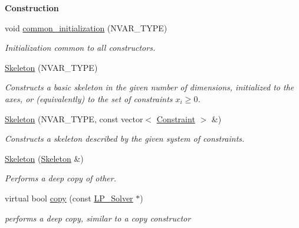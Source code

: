\begin{Indent}\textbf{ Construction}\par
\begin{DoxyCompactItemize}
\item 
\mbox{\label{group___c_l_s_solvers_aa63d9454338c84be898e1a604eba3527}} 
void \hyperlink{group___c_l_s_solvers_aa63d9454338c84be898e1a604eba3527}{common\+\_\+initialization} (N\+V\+A\+R\+\_\+\+T\+Y\+PE)
\begin{DoxyCompactList}\small\item\em Initialization common to all constructors. \end{DoxyCompactList}\item 
\hyperlink{group___c_l_s_solvers_ad9f2f64c49dbf96ebd30852e670e7642}{Skeleton} (N\+V\+A\+R\+\_\+\+T\+Y\+PE)
\begin{DoxyCompactList}\small\item\em Constructs a basic skeleton in the given number of dimensions, initialized to the axes, or (equivalently) to the set of constraints $ x_i \geq 0 $. \end{DoxyCompactList}\item 
\hyperlink{group___c_l_s_solvers_ad61d70c2397e93141de3ad3c987b1828}{Skeleton} (N\+V\+A\+R\+\_\+\+T\+Y\+PE, const vector$<$ \hyperlink{group___c_l_s_solvers_class_l_p___solvers_1_1_constraint}{Constraint} $>$ \&)
\begin{DoxyCompactList}\small\item\em Constructs a skeleton described by the given system of constraints. \end{DoxyCompactList}\item 
\mbox{\label{group___c_l_s_solvers_ae1d6983329c8624014fa5c9d66f75ac3}} 
\hyperlink{group___c_l_s_solvers_ae1d6983329c8624014fa5c9d66f75ac3}{Skeleton} (\hyperlink{group___c_l_s_solvers_class_l_p___solvers_1_1_skeleton}{Skeleton} \&)
\begin{DoxyCompactList}\small\item\em Performs a deep copy of {\ttfamily other}. \end{DoxyCompactList}\item 
virtual bool \hyperlink{group___c_l_s_solvers_a33b1747069c512ad69e30cb0c8786577}{copy} (const \hyperlink{group___c_l_s_solvers_class_l_p___solvers_1_1_l_p___solver}{L\+P\+\_\+\+Solver} $\ast$)
\begin{DoxyCompactList}\small\item\em performs a deep copy, similar to a copy constructor \end{DoxyCompactList}\end{DoxyCompactItemize}
\end{Indent}
